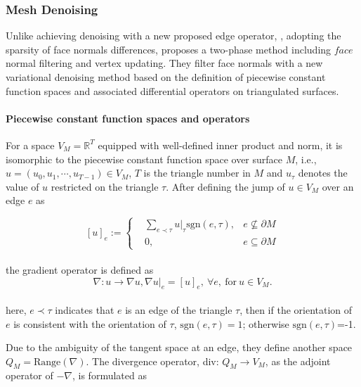 \subsubsection{Mesh Denoising}
\label{subsubsec:mesh denoising}
Unlike\cite{he2013mesh} achieving denoising with a new proposed edge operator, \cite{zhang2014variational}, adopting the sparsity of face normals differences, proposes a two-phase method including $face$ normal filtering and vertex updating.
They filter face normals with a new variational denoising method based on the definition of piecewise constant function spaces and associated differential operators on triangulated surfaces.

\paragraph{Piecewise constant function spaces and operators}
For a space $V_{M}=\mathbb{R}^{T}$ equipped with well-defined inner product and norm, it is isomorphic to the piecewise constant function space over surface $M$, i.e., $u=(u_0,u_1,\cdots, u_{T-1})\in V_{M}$, $T$ is the triangle number in $M$ and $u_{\tau}$ denotes the value of $u$ restricted on the triangle $\tau$. After defining the jump of $u\in V_{M}$ over an edge $e$ as

\small{
\begin{equation}
 \label{eq:edgejump}
 [u]_{e} := \left \{
 \begin{aligned}
 & \sum_{e\prec\tau}^{} u|_{\tau} \textrm{sgn}(e, \tau),  &e\nsubseteq \partial M \\
 & 0,  &e\subseteq \partial M
 \end{aligned}
 \right.
\end{equation}
}
\\
the gradient operator is defined as
\small{
\begin{equation}
 \label{eq:edgegradient}
 \nabla:u\rightarrow \nabla u, \nabla u|_{e}=[u]_{e},~\forall e, ~\textrm{for}~u\in V_{M}.
\end{equation}
}
\\
here, $e\prec\tau$ indicates that $e$ is an edge of the triangle $\tau$, then if the orientation of $e$ is consistent with the orientation of $\tau$, $\textrm{sgn}(e, \tau)=1$; otherwise $\textrm{sgn}(e, \tau)$=-1.

Due to the ambiguity of the tangent space at an edge, they define another space $Q_{M}=\textrm{Range}(\nabla)$. The divergence operator, div: $Q_{M}\rightarrow V_{M}$, as the adjoint operator of $-\nabla$, is formulated as

